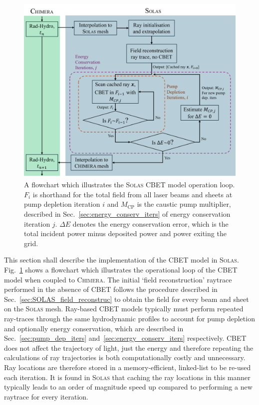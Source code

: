 \begin{figure}[t!]
    \includegraphics[width=0.9\linewidth]{Numerics/Images/CBET_flowchart.PNG}
    \centering
    \caption{A flowchart which illustrates the \textsc{Solas} \ac{CBET} model operation loop.
    $F_i$ is shorthand for the total field from all laser beams and sheets at pump depletion iteration $i$ and $M_{\text{CP}}$ is the caustic pump multiplier, described in Sec.~\ref{sec:energy_conserv_iters} of energy conservation iteration $j$.
    $\Delta E$ denotes the energy conservation error, which is the total incident power minus deposited power and power exiting the grid.}%
    \label{fig:SOLAS_CBET_flowchart}
\end{figure}

This section shall describe the implementation of the \ac{CBET} model in \textsc{Solas}.
Fig.~\ref{fig:SOLAS_CBET_flowchart} shows a flowchart which illustrates the operational loop of the \ac{CBET} model when coupled to \textsc{Chimera}.
The initial `field reconstruction' raytrace performed in the absence of \ac{CBET} follows the procedure described in Sec.~\ref{sec:SOLAS_field_reconstruc} to obtain the field for every beam and sheet on the \textsc{Solas} mesh.
Ray-based \ac{CBET} models typically must perform repeated ray-traces through the same hydrodynamic profiles to account for pump depletion and optionally energy conservation, which are described in Sec.~\ref{sec:pump_dep_iters} and~\ref{sec:energy_conserv_iters} respectively.
\ac{CBET} does not affect the trajectory of light, just the energy and therefore repeating the calculations of ray trajectories is both computationally costly and unnecessary.
Ray locations are therefore stored in a memory-efficient, linked-list to be re-used each iteration.
It is found in \textsc{Solas} that caching the ray locations in this manner typically leads to an order of magnitude speed up compared to performing a new raytrace for every iteration.

